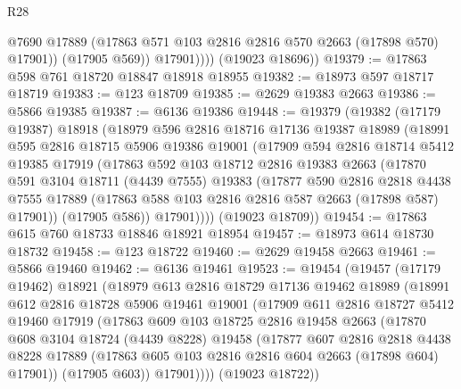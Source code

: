 \begin{lexlean}{R28}
\begin{coremodule}
                  @7690
                  @17889
                  (@17863 @571 @103 @2816 @2816 @570 @2663 (@17898 @570) @17901))
                (@17905 @569))
              @17901))))
      (@19023 @18696))
@19379 := @17863 @598 @761 @18720 @18847 @18918 @18955
@19382 := @18973 @597 @18717 @18719
@19383 := @123 @18709
@19385 := @2629 @19383 @2663
@19386 := @5866 @19385
@19387 := @6136 @19386
@19448 := @19379
    (@19382
      (@17179 @19387)
      @18918
      (@18979
        @596
        @2816
        @18716
        @17136
        @19387
        @18989
        (@18991
          @595
          @2816
          @18715
          @5906
          @19386
          @19001
          (@17909
            @594
            @2816
            @18714
            @5412
            @19385
            @17919
            (@17863
              @592
              @103
              @18712
              @2816
              @19383
              @2663
              (@17870
                @591
                @3104
                @18711
                (@4439 @7555)
                @19383
                (@17877
                  @590
                  @2816
                  @2818
                  @4438
                  @7555
                  @17889
                  (@17863 @588 @103 @2816 @2816 @587 @2663 (@17898 @587) @17901))
                (@17905 @586))
              @17901))))
      (@19023 @18709))
@19454 := @17863 @615 @760 @18733 @18846 @18921 @18954
@19457 := @18973 @614 @18730 @18732
@19458 := @123 @18722
@19460 := @2629 @19458 @2663
@19461 := @5866 @19460
@19462 := @6136 @19461
@19523 := @19454
    (@19457
      (@17179 @19462)
      @18921
      (@18979
        @613
        @2816
        @18729
        @17136
        @19462
        @18989
        (@18991
          @612
          @2816
          @18728
          @5906
          @19461
          @19001
          (@17909
            @611
            @2816
            @18727
            @5412
            @19460
            @17919
            (@17863
              @609
              @103
              @18725
              @2816
              @19458
              @2663
              (@17870
                @608
                @3104
                @18724
                (@4439 @8228)
                @19458
                (@17877
                  @607
                  @2816
                  @2818
                  @4438
                  @8228
                  @17889
                  (@17863 @605 @103 @2816 @2816 @604 @2663 (@17898 @604) @17901))
                (@17905 @603))
              @17901))))
      (@19023 @18722))

\end{coremodule}
\end{lexlean}
